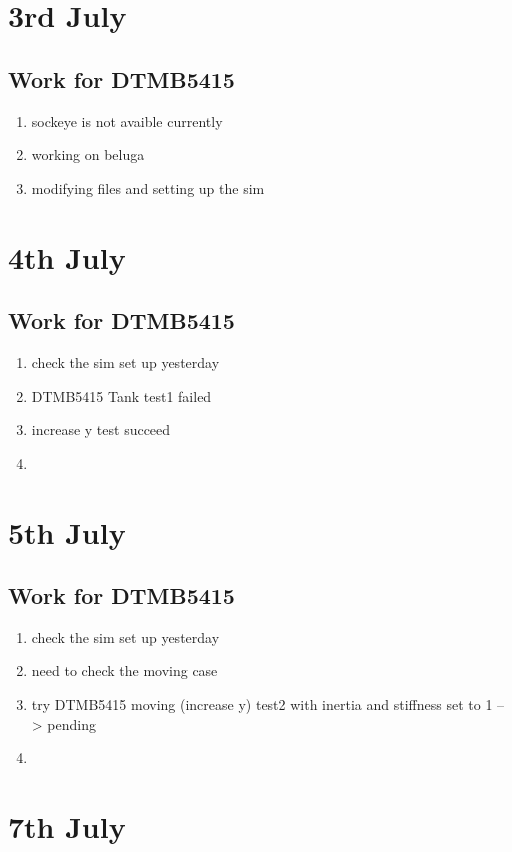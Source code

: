 \documentclass[12pt]{article} %
\begin{document}
\section{3rd July}
\subsection{Work for DTMB5415}
\begin{enumerate}
    \item sockeye is not avaible currently
    \item working on beluga
    \item modifying files and setting up the sim
\end{enumerate}
\section{4th July}
\subsection{Work for DTMB5415}
\begin{enumerate}
    \item check the sim set up yesterday
    \item DTMB5415 Tank test1 failed
    \item increase y test succeed
    \item 
\end{enumerate}
\section{5th July}
\subsection{Work for DTMB5415}
\begin{enumerate}
    \item check the sim set up yesterday
    \item need to check the moving case 
    \item try DTMB5415 moving (increase y) test2 with inertia and stiffness set to 1 --> pending
    \item 
\end{enumerate}
\section{7th July}
\end{document}
